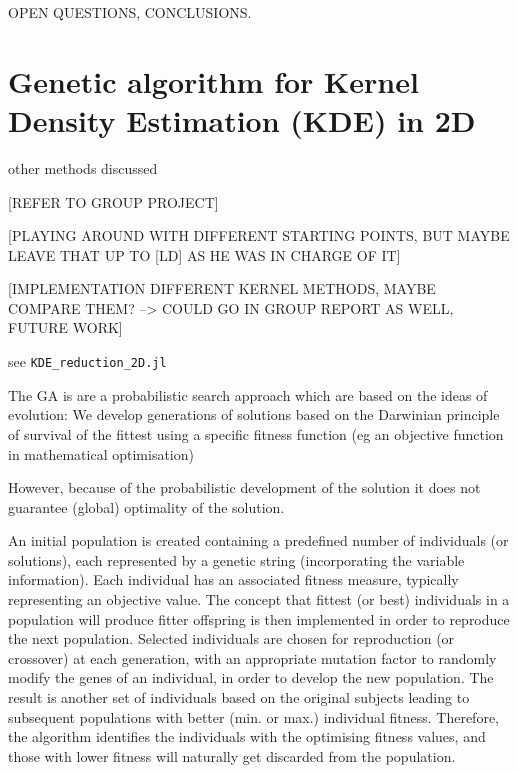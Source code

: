 \documentclass[journal, a4paper]{IEEEtran}
\begin{document}
OPEN QUESTIONS, CONCLUSIONS.


\section{Genetic algorithm for Kernel Density Estimation (KDE) in 2D}

other methods discussed

[REFER TO GROUP PROJECT]

[PLAYING AROUND WITH DIFFERENT STARTING POINTS, BUT MAYBE LEAVE THAT UP TO [LD] AS HE WAS IN CHARGE OF IT]

[IMPLEMENTATION DIFFERENT KERNEL METHODS, MAYBE COMPARE THEM? --> COULD GO IN GROUP REPORT AS WELL, FUTURE WORK]

see \texttt{KDE\_reduction\_2D.jl}


The GA is are a probabilistic search approach which are based on the ideas of evolution: We develop generations of solutions based on the Darwinian principle of survival of the fittest using a specific fitness function (eg an objective function in mathematical optimisation)

However, because of the probabilistic development of the solution it does not guarantee (global) optimality of the solution. 

An initial population is created containing a predefined number of individuals (or solutions), each represented by a genetic string (incorporating the variable information). Each individual has an associated fitness measure, typically representing an objective value. The concept that fittest (or best) individuals in a population will produce fitter offspring is then implemented in order to reproduce the next population. Selected individuals are chosen for reproduction (or crossover) at each generation, with an appropriate mutation factor to randomly modify the genes of an individual, in order to develop the new population. The result is another set of individuals based on the original subjects leading to subsequent populations with better (min. or max.) individual fitness. Therefore, the algorithm identifies the individuals with the optimising fitness values, and those with lower fitness will naturally get discarded from the population.
\end{document}
